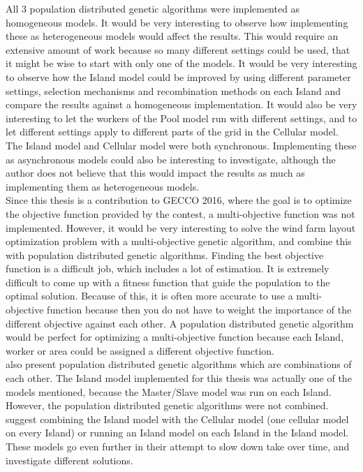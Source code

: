 \noindent All 3 population distributed genetic algorithms were implemented as homogeneous models. It would be very interesting to observe how implementing these as heterogeneous models would affect the results. This would require an extensive amount of work because so many different settings could be used, that it might be wise to start with only one of the models. It would be very interesting to observe how the Island model could be improved by using different parameter settings, selection mechanisms and recombination methods on each Island and compare the results against a homogeneous implementation. It would also be very interesting to let the workers of the Pool model run with different settings, and to let different settings apply to different parts of the grid in the Cellular model.\\


\noindent The Island model and Cellular model were both synchronous. Implementing these as asynchronous models could also be interesting to investigate, although the author does not believe that this would impact the results as much as implementing them as heterogeneous models.\\


\noindent Since this thesis is a contribution to GECCO 2016, where the goal is to optimize the objective function provided by the contest, a multi-objective function was not implemented. However, it would be very interesting to solve the wind farm layout optimization problem with a multi-objective genetic algorithm, and combine this with population distributed genetic algorithms. Finding the best objective function is a difficult job, which includes a lot of estimation. It is extremely difficult to come up with a fitness function that guide the population to the optimal solution. Because of this, it is often more accurate to use a multi-objective function because then you do not have to weight the importance of the different objective against each other. A population distributed genetic algorithm would be perfect for optimizing a multi-objective function because each Island, worker or area could be assigned a different objective function.\\


\noindent \cite{Gong} also present population distributed genetic algorithms which are combinations of each other. The Island model implemented for this thesis was actually one of the models mentioned, because the Master/Slave model was run on each Island. However, the population distributed genetic algorithms were not combined. \citep{Gong} suggest combining the Island model with the Cellular model (one cellular model on every Island) or running an Island model on each Island in the Island model. These models go even further in their attempt to slow down take over time, and investigate different solutions.\\


